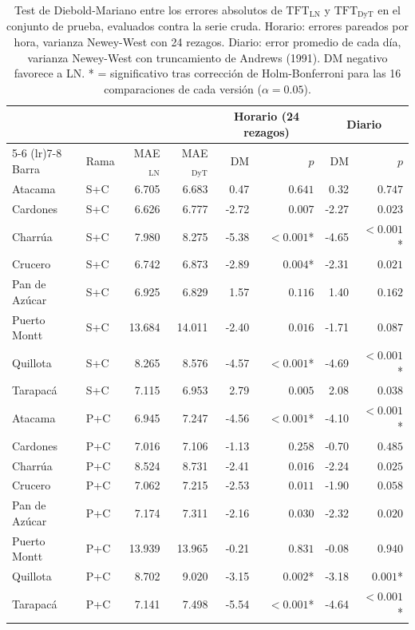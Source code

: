 \begin{table}[htbp]
    \centering
    \small
    \begin{tabular}{llrrrrrr}
        \toprule
        & & & & \multicolumn{2}{c}{Horario (24 rezagos)} & \multicolumn{2}{c}{Diario} \\
        \cmidrule(lr){5-6} \cmidrule(lr){7-8}
        Barra & Rama & MAE$_\text{LN}$ & MAE$_\text{DyT}$ & DM & $p$ & DM & $p$ \\
        \midrule
        Atacama       & S+C & 6.705 & 6.683 & 0.47 & $0.641$ & 0.32 & $0.747$ \\
        Cardones      & S+C & 6.626 & 6.777 & -2.72 & $0.007$ & -2.27 & $0.023$ \\
        Charrúa       & S+C & 7.980 & 8.275 & -5.38 & $<0.001$* & -4.65 & $<0.001$* \\
        Crucero       & S+C & 6.742 & 6.873 & -2.89 & $0.004$* & -2.31 & $0.021$ \\
        Pan de Azúcar & S+C & 6.925 & 6.829 & 1.57 & $0.116$ & 1.40 & $0.162$ \\
        Puerto Montt  & S+C & 13.684 & 14.011 & -2.40 & $0.016$ & -1.71 & $0.087$ \\
        Quillota      & S+C & 8.265 & 8.576 & -4.57 & $<0.001$* & -4.69 & $<0.001$* \\
        Tarapacá      & S+C & 7.115 & 6.953 & 2.79 & $0.005$ & 2.08 & $0.038$ \\
        Atacama       & P+C & 6.945 & 7.247 & -4.56 & $<0.001$* & -4.10 & $<0.001$* \\
        Cardones      & P+C & 7.016 & 7.106 & -1.13 & $0.258$ & -0.70 & $0.485$ \\
        Charrúa       & P+C & 8.524 & 8.731 & -2.41 & $0.016$ & -2.24 & $0.025$ \\
        Crucero       & P+C & 7.062 & 7.215 & -2.53 & $0.011$ & -1.90 & $0.058$ \\
        Pan de Azúcar & P+C & 7.174 & 7.311 & -2.16 & $0.030$ & -2.32 & $0.020$ \\
        Puerto Montt  & P+C & 13.939 & 13.965 & -0.21 & $0.831$ & -0.08 & $0.940$ \\
        Quillota      & P+C & 8.702 & 9.020 & -3.15 & $0.002$* & -3.18 & $0.001$* \\
        Tarapacá      & P+C & 7.141 & 7.498 & -5.54 & $<0.001$* & -4.64 & $<0.001$* \\
        \bottomrule
    \end{tabular}
    \vspace{0.2cm}
    \caption{Test de Diebold-Mariano entre los errores absolutos de $\text{TFT}_\text{LN}$ y $\text{TFT}_\text{DyT}$ en el conjunto de prueba, evaluados contra la serie cruda. Horario: errores pareados por hora, varianza Newey-West con 24 rezagos. Diario: error promedio de cada día, varianza Newey-West con truncamiento de Andrews (1991). DM negativo favorece a LN. * = significativo tras corrección de Holm-Bonferroni para las 16 comparaciones de cada versión ($\alpha=0.05$).}
    \label{tab:dm_ln_dyt}
\end{table}

